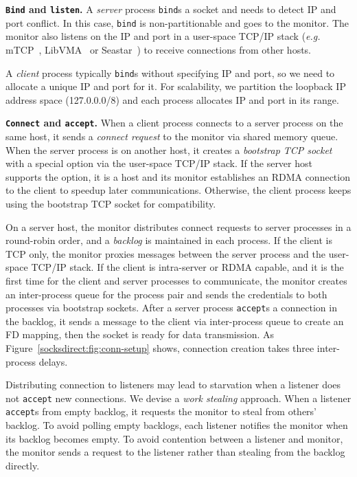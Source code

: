 \iffalse

\textbf{\texttt{Bind} and \texttt{listen}.}
A \emph{server} process \texttt{bind}s a socket and needs to detect IP and port conflict. In this case, \texttt{bind} is non-partitionable and goes to the monitor. The monitor also listens on the IP and port in a user-space TCP/IP stack (\textit{e.g.} mTCP~\cite{jeong2014mtcp}, LibVMA~\cite{libvma} or Seastar~\cite{seastar}) to receive connections from other hosts.

A \emph{client} process typically \texttt{bind}s without specifying IP and port, so we need to allocate a unique IP and port for it. For scalability, we partition the loopback IP address space (127.0.0.0/8) and each process allocates IP and port in its range.

\textbf{\texttt{Connect} and \texttt{accept}.}
When a client process connects to a server process on the same host, it sends a \textit{connect request} to the monitor via shared memory queue. When the server process is on another host, it creates a \textit{bootstrap TCP socket} with a special option via the user-space TCP/IP stack. If the server host supports the option, it is a \sys host and its monitor establishes an RDMA connection to the client to speedup later communications. Otherwise, the client process keeps using the bootstrap TCP socket for compatibility.

On a server host, the monitor distributes connect requests to server processes in a round-robin order, and a \textit{backlog} is maintained in each process. If the client is TCP only, the monitor proxies messages between the server process and the user-space TCP/IP stack. If the client is intra-server or RDMA capable, and it is the first time for the client and server processes to communicate, the monitor creates an inter-process queue for the process pair and sends the credentials to both processes via bootstrap sockets. After a server process \texttt{accept}s a connection in the backlog, it sends a message to the client via inter-process queue to create an FD mapping, then the socket is ready for data transmission. As Figure~\ref{socksdirect:fig:conn-setup} shows, connection creation takes three inter-process delays.

Distributing connection to listeners may lead to starvation when a listener does not \texttt{accept} new connections. We devise a \textit{work stealing} approach. When a listener \texttt{accept}s from empty backlog, it requests the monitor to steal from others' backlog. To avoid polling empty backlogs, each listener notifies the monitor when its backlog becomes empty. To avoid contention between a listener and monitor, the monitor sends a request to the listener rather than stealing from the backlog directly.

